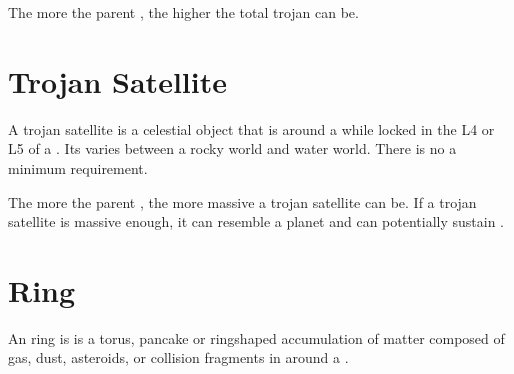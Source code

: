 \documentclass[letterpaper,10pt,english]{sphinxmanual}
\begin{document}
\sphinxAtStartPar
The more {\hyperref[\detokenize{quantities/material/mass:id1}]{}} the parent {\hyperref[\detokenize{celestial_bodies/planet:id1}]{}},
the higher the total {\hyperref[\detokenize{quantities/material/mass:id1}]{}} trojan can be.


\section{Trojan Satellite}
\label{\detokenize{celestial_bodies/trojan_satellite:trojan-satellite}}\label{\detokenize{celestial_bodies/trojan_satellite::doc}}\label{\detokenize{celestial_bodies/trojan_satellite:id1}}
\sphinxAtStartPar
A trojan satellite is a celestial object that is {\hyperref[\detokenize{quantities/orbital/orbital:id1}]{}} around a {\hyperref[\detokenize{celestial_bodies/star:id1}]{}}
while locked in the L4 or L5 {\hyperref[\detokenize{quantities/orbital/lagrange_position:id1}]{}} of a {\hyperref[\detokenize{celestial_bodies/planet:id1}]{}}.
Its {\hyperref[\detokenize{quantities/material/composition_type:id1}]{}}
varies between a rocky world and water world.
There is no a minimum {\hyperref[\detokenize{quantities/material/mass:id1}]{}} requirement.

\sphinxAtStartPar
The more {\hyperref[\detokenize{quantities/material/mass:id1}]{}} the parent {\hyperref[\detokenize{celestial_bodies/planet:id1}]{}},
the more massive a trojan satellite can be.
If a trojan satellite is massive enough, it can resemble a planet and can
potentially sustain {\hyperref[\detokenize{quantities/habitability/habitability:id1}]{}}.


\section{Ring}
\label{\detokenize{celestial_bodies/ring:ring}}\label{\detokenize{celestial_bodies/ring::doc}}\label{\detokenize{celestial_bodies/ring:id1}}
\sphinxAtStartPar
An ring is is a torus,
pancake or ring\sphinxhyphen{}shaped accumulation of matter composed of
gas, dust, asteroids, or collision fragments in {\hyperref[\detokenize{quantities/orbital/orbital:id1}]{}} around a {\hyperref[\detokenize{celestial_bodies/planet:id1}]{}}.
\end{document}
